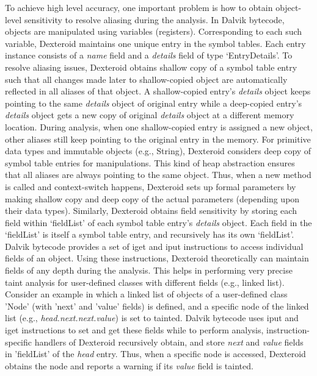 \documentclass[10pt]{elsarticle}
\begin{document}
To achieve high level accuracy, one important problem is how to obtain object-level sensitivity to resolve aliasing during the analysis. In Dalvik bytecode, objects are manipulated using variables (registers). Corresponding to each such variable, Dexteroid maintains one unique entry in the symbol tables. Each entry instance consists of a \emph{name} field and a \emph{details} field of type `EntryDetails'. To resolve aliasing issues, Dexteroid obtains shallow copy of a symbol table entry such that all changes made later to shallow-copied object are automatically reflected in all aliases of that object. A shallow-copied entry's \emph{details} object keeps pointing to the same \emph{details} object of original entry while a deep-copied entry's \emph{details} object gets a new copy of original \emph{details} object at a different memory location. During analysis, when one shallow-copied entry is assigned a new object, other aliases still keep pointing to the original entry in the memory. For primitive data types and immutable objects (e.g., {\ttfamily String}), Dexteroid considers deep copy of symbol table entries for manipulations. This kind of heap abstraction ensures that all aliases are always pointing to the same object. Thus, when a new method is called and context-switch happens, Dexteroid sets up formal parameters by making shallow copy and deep copy of the actual parameters (depending upon their data types). Similarly, Dexteroid obtains field sensitivity by storing each field within `fieldList' of each symbol table entry's \emph{details} object. Each field in the `fieldList' is itself a symbol table entry, and recursively has its own `fieldList'. Dalvik bytecode \cite{DalvikByteCode} provides a set of {\ttfamily iget} and {\ttfamily iput} instructions to access individual fields of an object. Using these instructions, Dexteroid theoretically can maintain fields of any depth during the analysis. This helps in performing very precise taint analysis for user-defined classes with different fields (e.g., linked list). Consider an example in which a linked list of objects of a user-defined class 'Node' (with 'next' and 'value' fields) is defined,  and a specific node of the linked list (e.g., \emph{head.next.next.value}) is set to tainted. Dalvik bytecode uses {\ttfamily iput} and {\ttfamily iget} instructions to set and get these fields while to perform analysis, instruction-specific handlers of Dexteroid recursively obtain, and store \emph{next} and \emph{value} fields in 'fieldList' of the \emph{head} entry. Thus, when a specific node is accessed, Dexteroid obtains the node and reports a warning if its \emph{value} field is tainted.
\end{document}
